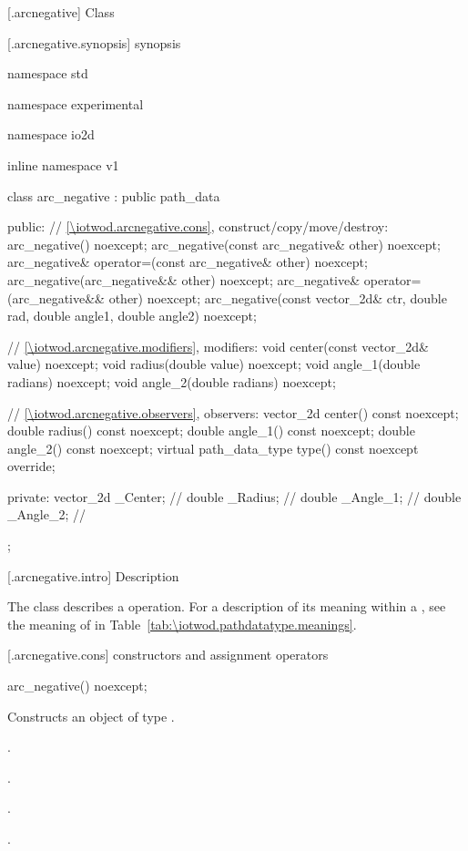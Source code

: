  [\iotwod.arcnegative] {Class }

 [\iotwod.arcnegative.synopsis] { synopsis}

\begin{codeblock}
namespace std { namespace experimental { namespace io2d { inline namespace v1 {
  class arc_negative : public path_data {
  public:
    // \ref{\iotwod.arcnegative.cons}, construct/copy/move/destroy:
    arc_negative() noexcept;
    arc_negative(const arc_negative& other) noexcept;
    arc_negative& operator=(const arc_negative& other) noexcept;
    arc_negative(arc_negative&& other) noexcept;
    arc_negative& operator=(arc_negative&& other) noexcept;
    arc_negative(const vector_2d& ctr, double rad, double angle1,
      double angle2) noexcept;

    // \ref{\iotwod.arcnegative.modifiers}, modifiers:
    void center(const vector_2d& value) noexcept;
    void radius(double value) noexcept;
    void angle_1(double radians) noexcept;
    void angle_2(double radians) noexcept;

    // \ref{\iotwod.arcnegative.observers}, observers:
    vector_2d center() const noexcept;
    double radius() const noexcept;
    double angle_1() const noexcept;
    double angle_2() const noexcept;
    virtual path_data_type type() const noexcept override;

  private:
    vector_2d _Center;   // \expos
    double _Radius;  // \expos
    double _Angle_1; // \expos
    double _Angle_2; // \expos
  };
} } } }
\end{codeblock}

 [\iotwod.arcnegative.intro] { Description}

\pnum
{}
The class  describes a  operation. For a description of its meaning within a , see the meaning of  in Table~\ref{tab:\iotwod.pathdatatype.meanings}.

 [\iotwod.arcnegative.cons] { constructors and assignment operators}

\begin{itemdecl}
    arc_negative() noexcept;
\end{itemdecl}
\begin{itemdescr}
	\pnum
	\effects
	Constructs an object of type .
	
	\pnum
	\postconditions
	.

	.

	.

	.

\end{itemdescr}

